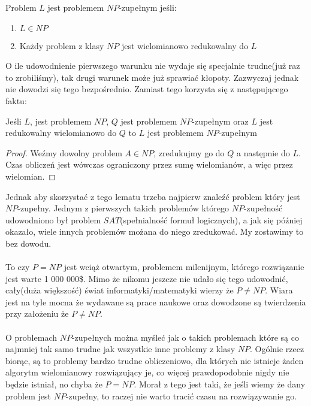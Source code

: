 \begin{definition}
Problem $L$ jest problemem $NP$-zupełnym jeśli:
\begin{enumerate}
\item $L \in NP$
\item Każdy problem z klasy $NP$ jest wielomianowo redukowalny do $L$
\end{enumerate}
\end{definition}
\noindent
O ile udowodnienie pierwszego warunku nie wydaje się specjalnie trudne(już raz to zrobiliśmy), tak drugi warunek może już sprawiać kłopoty. 
Zazwyczaj jednak nie dowodzi się tego bezpośrednio. 
Zamiast tego korzysta się z następującego faktu:
\begin{lemma}
Jeśli $L$, jest problemem $NP$, $Q$ jest problemem $NP$-zupełnym oraz $L$ jest redukowalny wielomianowo do $Q$ to $L$ jest problemem $NP$-zupełnym
\end{lemma}
\begin{proof}
Weźmy dowolny problem $A \in NP$, zredukujmy go do $Q$ a następnie do $L$. Czas obliczeń jest wówczas ograniczony przez sumę wielomianów, a więc przez wielomian.
\end{proof}
\noindent
Jednak aby skorzystać z tego lematu trzeba najpierw znaleźć problem który jest $NP$-zupełny. 
Jednym z pierwszych takich problemów którego $NP$-zupełność udowodniono był problem $SAT$(spełnialność formuł logicznych), a jak się później okazało, 
wiele innych problemów możana do niego zredukować. 
My zostawimy to bez dowodu. 
\\ 
\\ \noindent
To czy $P = NP$ jest wciąż otwartym, problemem milenijnym, którego rozwiązanie jest warte 1 000 000\$. 
Mimo że nikomu jeszcze nie udało się tego udowodnić, cały(duża większość) świat informatyki/matematyki wierzy że $P \neq NP$. 
Wiara jest na tyle mocna że wydawane są prace naukowe oraz dowodzone są twierdzenia przy założeniu że $P \neq NP$.
\\ 
\\ \noindent
O problemach $NP$-zupełnych można myśleć jak o takich problemach które są co najmniej tak samo trudne jak wszystkie inne problemy z klasy $NP$. 
Ogólnie rzecz biorąc, są to problemy bardzo trudne obliczeniowo, dla których nie istnieje żaden algorytm wielomianowy rozwiązujący je, co więcej prawdopodobnie nigdy nie będzie istniał, no chyba że $P = NP$.
Morał z tego jest taki, że jeśli wiemy że dany problem jest $NP$-zupełny, to raczej nie warto tracić czasu na rozwiązywanie go.
\\ 
